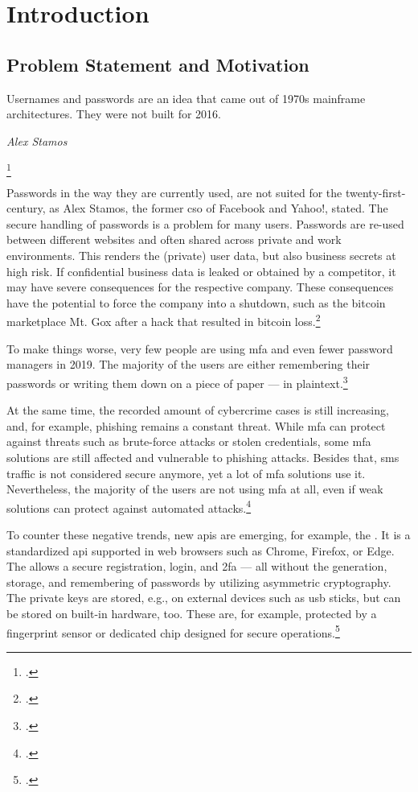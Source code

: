 \chapter{Introduction}
\label{chapter:introduction}

\section{Problem Statement and Motivation}

\setlength{}
\epigraph{\frqq Usernames and passwords are an idea that came out of 1970s mainframe architectures. They were not built for 2016.\flqq\footnotemark}{\textit{Alex Stamos}}
\footcitetext{stamos}

Passwords in the way they are currently used, are not suited for the twenty-first-century, as Alex Stamos, the former \gls{cso} of Facebook and Yahoo!, stated. The secure handling of passwords is a problem for many users. Passwords are re-used between different websites and often shared across private and work environments. This renders the (private) user data, but also business secrets at high risk. If confidential business data is leaked or obtained by a competitor, it may have severe consequences for the respective company. These consequences have the potential to force the company into a shutdown, such as the bitcoin marketplace Mt. Gox after a hack that resulted in bitcoin loss.\footcites[See][43]{rosenberger2018bitcoin}

To make things worse, very few people are using \gls{mfa} and even fewer password managers in 2019. The majority of the users are either remembering their passwords or writing them down on a piece of paper --- in plaintext.\footcites[See][]{ibm-security}[See][]{web-de-passwords}

At the same time, the recorded amount of cybercrime cases is still increasing, and, for example, phishing remains a constant threat. While \gls{mfa} can protect against threats such as brute-force attacks or stolen credentials, some \gls{mfa} solutions are still affected and vulnerable to phishing attacks. Besides that, \gls{sms} traffic is not considered secure anymore, yet a lot of \gls{mfa} solutions use it. Nevertheless, the majority of the users are not using \gls{mfa} at all, even if weak solutions can protect against automated attacks.\footcites[See][]{infratest-dimap}[See][6--7]{bka-cybercrime}[See][58]{dotson2019practical}[See][2]{Doerfler:2019:ELC:3308558.3313481}

To counter these negative trends, new \glspl{api} are emerging, for example, the \wa. It is a standardized \gls{api} supported in web browsers such as Chrome, Firefox, or Edge. The \wa{} allows a secure registration, login, and \gls{2fa} --- all without the generation, storage, and remembering of passwords by utilizing asymmetric cryptography. The private keys are stored, e.g., on external devices such as \gls{usb} sticks, but can be stored on built-in hardware, too. These are, for example, protected by a fingerprint sensor or dedicated chip designed for secure operations.\footcites[See][Chapter 1]{w3c}

